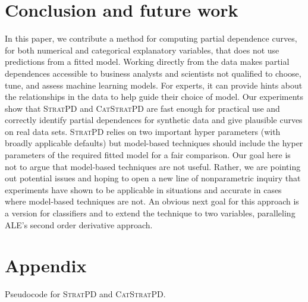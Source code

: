 \documentclass[]{article} %
\newcommand{\spd}{\fontfamily{cmr}\textsc{\small StratPD}}
\newcommand{\cspd}{\fontfamily{cmr}\textsc{\small CatStratPD}}
\begin{document}
\section{Conclusion and future work}

In this paper, we contribute a method for computing partial dependence curves, for both numerical and categorical explanatory variables, that does not use  predictions from a fitted model.   Working directly from the data  makes partial dependences accessible to business analysts and scientists not qualified to choose, tune, and assess machine learning models.  For experts, it can  provide hints about the relationships in the data to help guide their choice of model. Our experiments show that \spd{} and \cspd{} are fast enough for practical use and correctly identify partial dependences for synthetic data and give plausible curves on real data sets. \spd{} relies on two important hyper parameters (with broadly applicable defaults) but model-based techniques should include the hyper parameters of the required fitted model for a fair comparison.  Our goal here is not to  argue  that model-based techniques are not useful. Rather, we are pointing out potential issues and hoping to open a new line of nonparametric inquiry that experiments have shown to be applicable in situations and accurate in cases where model-based techniques are not. An obvious next goal for this approach is a version for classifiers and to extend the technique to two variables, paralleling ALE's second order derivative approach. 

%
%
%
{

}


\section{Appendix}

Pseudocode for \spd{} and \cspd.\\
\end{document}
